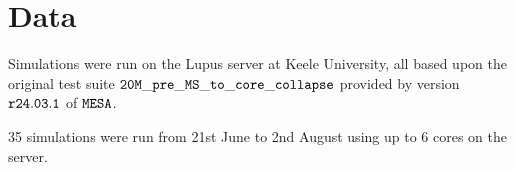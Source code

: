 \section{Data}\label{sec: Data}

Simulations were run on the Lupus server at Keele University, all based upon the original test suite ${\tt 20M\_pre\_MS\_to\_core\_collapse}$ provided by version ${\tt r24.03.1}$ of ${\tt MESA}$.

35 simulations were run from 21st June to 2nd August using up to 6 cores on the server.
